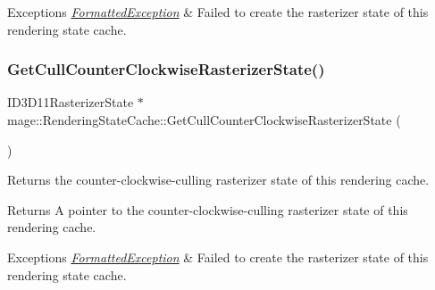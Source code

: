 \begin{DoxyExceptions}{Exceptions}
{\em \hyperlink{structmage_1_1_formatted_exception}{Formatted\+Exception}} & Failed to create the rasterizer state of this rendering state cache. \\
\hline
\end{DoxyExceptions}
\hypertarget{structmage_1_1_rendering_state_cache_aa41c6a83a929c09f040dddbd4e21d5fb}{}\label{structmage_1_1_rendering_state_cache_aa41c6a83a929c09f040dddbd4e21d5fb} 
\subsubsection{\texorpdfstring{Get\+Cull\+Counter\+Clockwise\+Rasterizer\+State()}{GetCullCounterClockwiseRasterizerState()}}
{\footnotesize\ttfamily I\+D3\+D11\+Rasterizer\+State $\ast$ mage\+::\+Rendering\+State\+Cache\+::\+Get\+Cull\+Counter\+Clockwise\+Rasterizer\+State (\begin{DoxyParamCaption}{ }\end{DoxyParamCaption})}

Returns the counter-\/clockwise-\/culling rasterizer state of this rendering cache.

\begin{DoxyReturn}{Returns}
A pointer to the counter-\/clockwise-\/culling rasterizer state of this rendering cache. 
\end{DoxyReturn}

\begin{DoxyExceptions}{Exceptions}
{\em \hyperlink{structmage_1_1_formatted_exception}{Formatted\+Exception}} & Failed to create the rasterizer state of this rendering state cache. \\
\hline
\end{DoxyExceptions}
\hypertarget{structmage_1_1_rendering_state_cache_af9c689e85b54cf0af4018c20e3ab61a1}{}\label{structmage_1_1_rendering_state_cache_af9c689e85b54cf0af4018c20e3ab61a1} 

